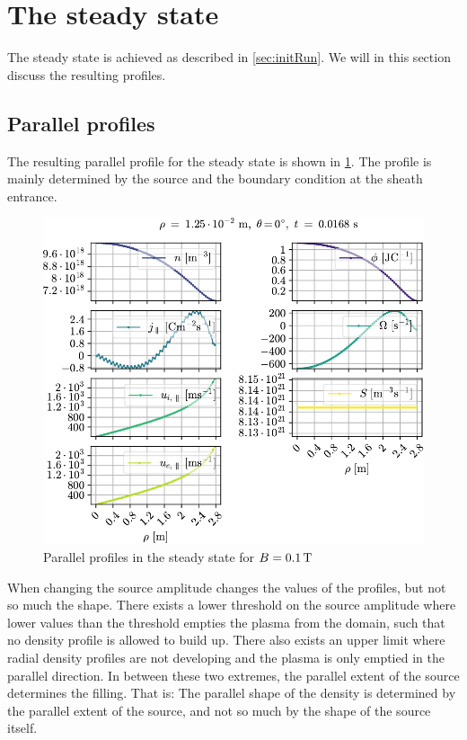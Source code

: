 \section{The steady state}
%
The steady state is achieved as described in \cref{sec:initRun}.
We will in this section discuss the resulting profiles.

\subsection{Parallel profiles}
%
The resulting parallel profile for the steady state is shown in \cref{fig:parProfs}.
The profile is mainly determined by the source and the boundary condition at the sheath entrance.
%
\begin{figure}[htb]
    \centering
    \includegraphics{fig/results/1DProfiles/B010Par}
    \caption{Parallel profiles in the steady state for $B=0.1\, \text{T}$}
    \label{fig:parProfs}
\end{figure}
%

When changing the source amplitude changes the values of the profiles, but not so much the shape.
There exists a lower threshold on the source amplitude where lower values than the threshold empties the plasma from the domain, such that no density profile is allowed to build up.
There also exists an upper limit where radial density profiles are not developing and the plasma is only emptied in the parallel direction.
In between these two extremes, the parallel extent of the source determines the filling.
That is: The parallel shape of the density is determined by the parallel extent of the source, and not so much by the shape of the source itself.

